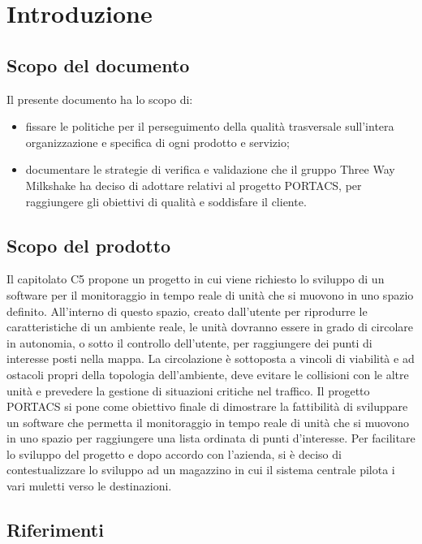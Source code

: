 \section{Introduzione}
\subsection{Scopo del documento}
    Il presente documento ha lo scopo di:
    \begin{itemize}
        \item fissare le politiche per il perseguimento della qualità trasversale sull'intera organizzazione e specifica di ogni prodotto e servizio;
        \item documentare le strategie di verifica e validazione che il gruppo Three Way Milkshake ha deciso di adottare relativi al progetto PORTACS, per raggiungere gli obiettivi di qualità e soddisfare il cliente.
    \end{itemize}


\subsection{Scopo del prodotto}
    Il capitolato C5 propone un progetto in cui viene richiesto lo sviluppo di un software per il monitoraggio in tempo reale di unità che si muovono in uno spazio definito. All'interno di questo spazio, creato dall'utente per riprodurre le caratteristiche di un ambiente reale, le unità dovranno essere in grado di circolare in autonomia, o sotto il controllo dell'utente, per raggiungere dei punti di interesse posti nella mappa.  La circolazione è sottoposta a vincoli di viabilità e ad ostacoli propri della topologia dell'ambiente, deve evitare le collisioni con le altre unità e prevedere la gestione di situazioni critiche nel traffico.
    \newline\newline
    Il progetto PORTACS si pone come obiettivo finale di dimostrare la fattibilità di sviluppare un software che permetta il monitoraggio in tempo reale di unità che si muovono in uno spazio per raggiungere una lista ordinata di punti d’interesse. Per facilitare lo sviluppo del progetto e dopo accordo con l'azienda, si è deciso di contestualizzare lo sviluppo ad un magazzino in cui il sistema centrale pilota i vari muletti verso le destinazioni.

\subsection{Riferimenti}
\label{ref}
